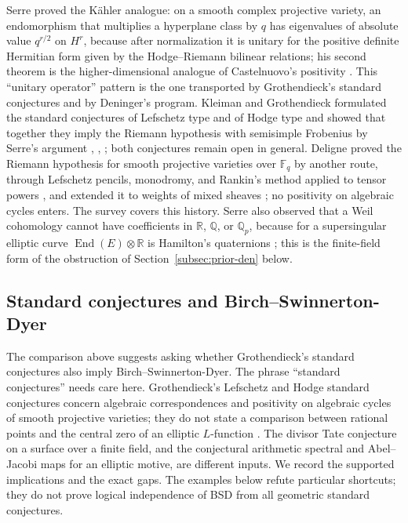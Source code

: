 \documentclass[11pt]{amsart}
\theoremstyle{plain}
\theoremstyle{definition}
\theoremstyle{remark}
\numberwithin{equation}{section}
\newcommand{\R}{\mathbb{R}}
\newcommand{\Q}{\mathbb{Q}}
\newcommand{\F}{\mathbb{F}}
\begin{document}
Serre proved the K\"ahler analogue: on a smooth complex projective
variety, an endomorphism that multiplies a hyperplane class by $q$ has
eigenvalues of absolute value $q^{r/2}$ on $H^r$, because after
normalization it is unitary for the positive definite Hermitian form
given by the Hodge--Riemann bilinear relations; his second theorem is
the higher-dimensional analogue of Castelnuovo's positivity
\cite[Th\'eor\`emes~1 and~2, pp.~392--394]{Serre1960Analogues}. This
``unitary operator'' pattern is the one transported by Grothendieck's
standard conjectures and by Deninger's program. Kleiman and
Grothendieck formulated the standard conjectures of Lefschetz type and
of Hodge type and showed that together they imply the Riemann
hypothesis with semisimple Frobenius by Serre's argument
\cite[pp.~359--361, 3.11 pp.~380--381, Lemma~4.6 p.~385,
Theorem~4.7 p.~386]{Kleiman1968Cycles},
\cite[Remark~(2), p.~197]{Grothendieck1969Standard},
\cite[Theorem~5-6, p.~19]{Kleiman1994Standard}; both conjectures remain
open in general. Deligne proved the Riemann hypothesis for smooth
projective varieties over $\F_q$ by another route, through Lefschetz
pencils, monodromy, and Rankin's method applied to tensor powers
\cite[Th\'eor\`eme~(1.6), p.~276, and \S3, pp.~283--284]{Deligne1974WeilI},
and extended it to weights of mixed sheaves
\cite[Th\'eor\`eme~1, p.~138]{Deligne1980WeilII}; no positivity on
algebraic cycles enters. The survey \cite{Milne2016RHFF} covers this
history. Serre also observed that a Weil cohomology cannot have
coefficients in $\R$, $\Q$, or $\Q_p$, because for a supersingular
elliptic curve $\operatorname{End}(E)\otimes\R$ is Hamilton's
quaternions \cite[(2.2) and fn.~25, p.~27]{Milne2016RHFF}; this is the
finite-field form of the obstruction of Section~\ref{subsec:prior-den}
below.

\subsection{Standard conjectures and Birch--Swinnerton-Dyer}
\label{subsec:prior-sc-bsd}

The comparison above suggests asking whether Grothendieck's standard
conjectures also imply Birch--Swinnerton-Dyer. The phrase ``standard
conjectures'' needs care here. Grothendieck's Lefschetz and Hodge standard
conjectures concern algebraic correspondences and positivity on algebraic
cycles of smooth projective varieties; they do not state a comparison
between rational points and the central zero of an elliptic $L$-function
\cite[pp.~193--197]{Grothendieck1969Standard}. The divisor Tate
conjecture on a surface over a finite field, and the conjectural
arithmetic spectral and Abel--Jacobi maps for an elliptic motive, are
different inputs. We record the supported implications and the exact
gaps. The examples below refute particular shortcuts; they do not prove
logical independence of BSD from all geometric standard conjectures.
\end{document}
